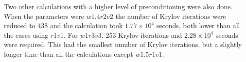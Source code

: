 \documentclass[preprint,12pt]{elsarticle}
\begin{document}

Two other calculations with a higher level of preconditioning were also done. When the parameters were $w1.4r2v2$ the number of Krylov iterations were reduced to 438 and the calculation took $1.77 \times 10^{4}$ seconds, both lower than all the cases using $r1v1$. For $w1r3v3$, 253 Krylov iterations and $2.28 \times 10^{4}$ seconds were required. This had the smallest number of Krylov iterations, but a slightly longer time than all the calculations except $w1.5r1v1$.	
\end{document}
